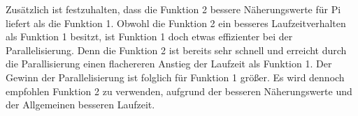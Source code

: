 Zusätzlich ist festzuhalten, dass die Funktion 2 bessere Näherungswerte für Pi liefert als die Funktion 1.
Obwohl die Funktion 2 ein besseres Laufzeitverhalten als Funktion 1 besitzt, ist Funktion 1 doch etwas effizienter bei der Parallelisierung.
Denn die Funktion 2 ist bereits sehr schnell und erreicht durch die Parallisierung einen flachereren Anstieg der Laufzeit als Funktion 1.
Der Gewinn der Parallelisierung ist folglich für Funktion 1 größer.
Es wird dennoch empfohlen Funktion 2 zu verwenden, aufgrund der besseren Näherungswerte und der Allgemeinen besseren Laufzeit.


